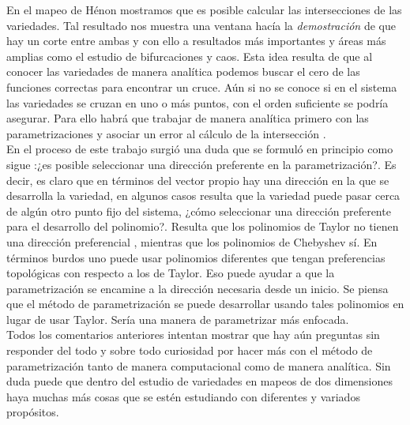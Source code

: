 En el mapeo de Hénon mostramos que es posible calcular las intersecciones de las variedades. Tal resultado nos muestra una ventana hacía la \emph{demostración} de que hay un corte entre ambas y con ello a resultados más importantes y áreas más amplias como el estudio de bifurcaciones y caos. Esta idea resulta de que al conocer las variedades de manera analítica podemos buscar el cero de las funciones correctas para encontrar un cruce. Aún si no se conoce si en el sistema las variedades se cruzan en uno o más puntos, con el orden suficiente se podría asegurar. Para ello habrá que trabajar de manera analítica primero con las parametrizaciones y asociar un error al cálculo de la intersección . \\

En el proceso de este trabajo surgió una duda que se formuló en principio como sigue :¿es posible seleccionar una dirección preferente en la parametrización?. Es decir, es claro que en términos del vector propio hay una dirección en la que se desarrolla la variedad, en algunos casos resulta que la variedad puede pasar cerca de algún otro punto fijo del sistema, ¿cómo seleccionar una dirección preferente para el desarrollo del polinomio?. Resulta que los polinomios de Taylor no tienen una dirección preferencial , mientras que los polinomios de Chebyshev sí. En términos burdos uno puede usar polinomios diferentes que tengan preferencias topológicas con respecto a los de Taylor. Eso puede ayudar a que la parametrización se encamine a la dirección necesaria desde un inicio. Se piensa que el método de parametrización se puede desarrollar usando tales polinomios en lugar de usar Taylor. Sería una manera de parametrizar más enfocada. \\
Todos los comentarios anteriores intentan mostrar que hay aún preguntas sin responder del todo y sobre todo curiosidad por hacer más con el método de parametrización tanto de manera computacional como de manera analítica. Sin duda puede que dentro del estudio de variedades en mapeos de dos dimensiones haya muchas más cosas que se estén estudiando con diferentes y variados propósitos. 


